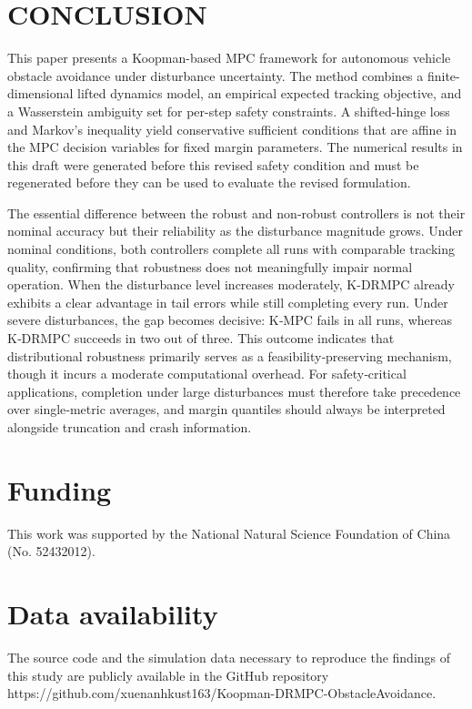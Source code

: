 \documentclass[pdflatex,sn-mathphys,Numbered]{sn-jnl}
\numberwithin{equation}{section}
\newcommand{\supphead}[1]{\ifsnclass\bmhead{#1}\else\section*{#1}\fi}
\newcommand{\enterbackmatter}{\ifsnclass\backmatter\fi}
\begin{document}
	
	\section{CONCLUSION}
	\label{sec6}
	
	This paper presents a Koopman-based MPC framework for autonomous vehicle obstacle avoidance under disturbance uncertainty. The method combines a finite-dimensional lifted dynamics model, an empirical expected tracking objective, and a Wasserstein ambiguity set for per-step safety constraints. A shifted-hinge loss and Markov's inequality yield conservative sufficient conditions that are affine in the MPC decision variables for fixed margin parameters. The numerical results in this draft were generated before this revised safety condition and must be regenerated before they can be used to evaluate the revised formulation.

The essential difference between the robust and non‑robust controllers is not their nominal accuracy but their reliability as the disturbance magnitude grows. Under nominal conditions, both controllers complete all runs with comparable tracking quality, confirming that robustness does not meaningfully impair normal operation. When the disturbance level increases moderately, K-DRMPC already exhibits a clear advantage in tail errors while still completing every run. Under severe disturbances, the gap becomes decisive: K‑MPC fails in all runs, whereas K‑DRMPC succeeds in two out of three. This outcome indicates that distributional robustness primarily serves as a feasibility‑preserving mechanism, though it incurs a moderate computational overhead. For safety‑critical applications, completion under large disturbances must therefore take precedence over single‑metric averages, and margin quantiles should always be interpreted alongside truncation and crash information.

\enterbackmatter

\supphead{Funding}

This work was supported by the National Natural Science Foundation of China (No. 52432012).

\supphead{Data availability}

The source code and the simulation data necessary to reproduce the findings of this study are publicly available in the GitHub repository https://github.com/xuenanhkust163/Koopman-DRMPC-ObstacleAvoidance.
	
\end{document}
